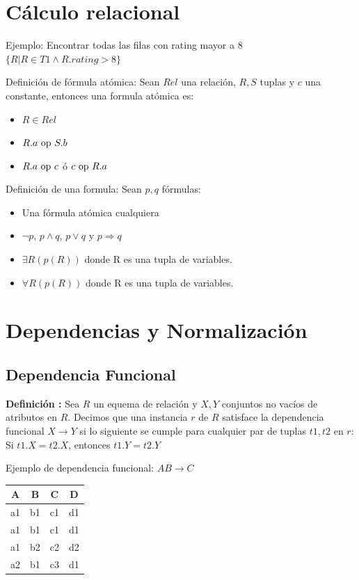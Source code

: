 \documentclass[11pt,letterpaper]{article}
\begin{document}
\section{Cálculo relacional}
Ejemplo: Encontrar todas las filas con rating mayor a 8
$\{ R| R \in T1 \wedge R.rating > 8\} $

Definición de fórmula atómica: Sean $Rel$ una relación, $R,S$ tuplas y $c$ una constante, entonces una formula atómica es:
\begin{itemize}
	\item $R \in Rel$
	\item $R.a\textnormal{  op }S.b$
	\item $R.a\textnormal{ op }c$ ó $c\textnormal{ op }R.a$
\end{itemize}

Definición de una formula: Sean $p,q$ fórmulas:
\begin{itemize}
	\item Una fórmula atómica cualquiera
	\item $\neg p$, $p \wedge q$, $p \vee q$ y $p \Rightarrow q$
	\item $\exists R(p(R))$ donde R es una tupla de variables.
	\item $\forall R(p(R))$ donde R es una tupla de variables.
\end{itemize}


\section{Dependencias y Normalización}
\subsection{Dependencia Funcional}
\textbf{Definición :}
Sea $R$ un equema de relación y $X,Y$ conjuntos no vacíos de atributos en $R$. Decimos que una instancia $r$ de $R$ satisface la dependencia funcional $X\rightarrow Y$ si lo siguiente se cumple para cualquier par de tuplas $t1,t2$ en $r$: Si $t1.X = t2.X$, entonces $t1.Y = t2.Y$

Ejemplo de dependencia funcional: $AB \rightarrow C$
\begin{table}[h!]
	\center
	\begin{tabular}{|c|c|c|c|}
	\hline
	 A &  B &  C &  D \\ \hline\hline
	a1 & b1 & c1 & d1 \\ \hline
	a1 & b1 & c1 & d1 \\ \hline
	a1 & b2 & c2 & d2 \\ \hline
	a2 & b1 & c3 & d1 \\ \hline
		
	\end{tabular}
\end{table}
\end{document}
